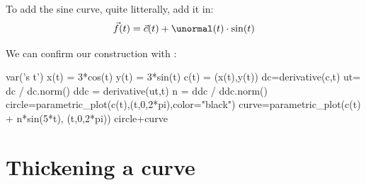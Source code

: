 \documentclass{ximera}
\begin{document}
\begin{example}
\begin{explanation}
\begin{image}
\end{image}
To add the sine curve, quite litterally, add it in:
\[
\vec{f}(t) = \vec{c}(t) + \unormal(t)\cdot \sin(t)
\]
\begin{onlineOnly}
We can confirm our construction with \sage: 
\begin{sageCell}
var('s t')
x(t) = 3*cos(t)
y(t) = 3*sin(t)
c(t) = (x(t),y(t))
dc=derivative(c,t)
ut= dc / dc.norm()
ddc = derivative(ut,t)
n = ddc / ddc.norm()
circle=parametric_plot(c(t),(t,0,2*pi),color="black")
curve=parametric_plot(c(t) + n*sin(5*t), (t,0,2*pi))
circle+curve
\end{sageCell}
\end{onlineOnly}
  \end{explanation}
\end{example}

\section{Thickening a curve}
\end{document}
